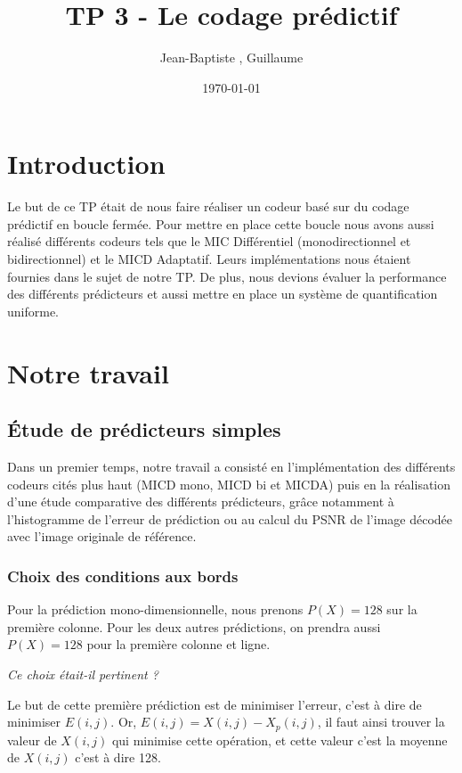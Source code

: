 \documentclass[12pt]{report}
\title{TP 3 - Le codage prédictif}
\author{Jean-Baptiste \bsc{Morice}, Guillaume \bsc{Versal}}
\date{\today}
\renewcommand{\emph}{\textit}
\begin{document}
\maketitle

\tableofcontents

\newpage
\section*{Introduction}

Le but de ce TP était de nous faire réaliser un codeur basé sur du codage prédictif en boucle fermée. Pour mettre en place cette boucle nous avons aussi réalisé différents codeurs tels que le MIC Différentiel (monodirectionnel et bidirectionnel) et le MICD Adaptatif. Leurs implémentations nous étaient fournies dans le sujet de notre TP. De plus, nous devions évaluer la performance des différents prédicteurs et aussi mettre en place un système de quantification uniforme.


\newpage
\section{Notre travail}

\subsection{Étude de prédicteurs simples}

Dans un premier temps, notre travail a consisté en l'implémentation des différents codeurs cités plus haut (MICD mono, MICD bi et MICDA) puis en la réalisation d'une étude comparative des différents prédicteurs, grâce notamment à l'histogramme de l'erreur de prédiction ou au calcul du PSNR de l'image décodée avec l'image originale de référence.

\subsubsection{Choix des conditions aux bords}

Pour la prédiction mono-dimensionnelle,  nous prenons $P(X) = 128$ sur la première colonne. Pour les deux autres prédictions, on prendra aussi $P(X) = 128$ pour la première colonne et ligne. 

\emph{Ce choix était-il pertinent ?}

Le but de cette première prédiction est de minimiser l'erreur, c'est à dire de minimiser $E(i,j)$. Or, $E(i,j) = X(i,j) - X_p(i,j)$, il faut ainsi trouver la valeur de $X(i,j)$ qui minimise cette opération, et cette valeur c'est la moyenne de $X(i,j)$ c'est à dire 128.
\end{document}
